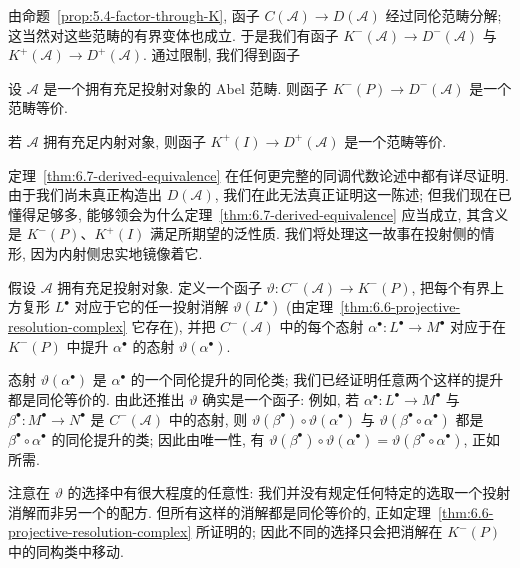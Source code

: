 由命题~\ref{prop:5.4-factor-through-K}, 函子 $C(\mathcal{A})\to D(\mathcal{A})$ 经过同伦范畴分解; 这当然对这些范畴的有界变体也成立. 于是我们有函子 $K^{-}(\mathcal{A})\to D^{-}(\mathcal{A})$ 与 $K^{+}(\mathcal{A})\to D^{+}(\mathcal{A})$. 通过限制, 我们得到函子

\begin{theorem}\label{thm:6.7-derived-equivalence}
设 $\mathcal{A}$ 是一个拥有充足投射对象的 Abel 范畴. 则函子 $K^{-}(P)\to D^{-}(\mathcal{A})$ 是一个范畴等价.

若 $\mathcal{A}$ 拥有充足内射对象, 则函子 $K^{+}(I)\to D^{+}(\mathcal{A})$ 是一个范畴等价.
\end{theorem}

\noindent 定理~\ref{thm:6.7-derived-equivalence} 在任何更完整的同调代数论述中都有详尽证明. 由于我们尚未真正构造出 $D(\mathcal{A})$, 我们在此无法真正证明这一陈述; 但我们现在已懂得足够多, 能够领会为什么定理~\ref{thm:6.7-derived-equivalence} 应当成立, 其含义是 $K^{-}(P)$、$K^{+}(I)$ 满足所期望的泛性质. 我们将处理这一故事在投射侧的情形, 因为内射侧忠实地镜像着它.

假设 $\mathcal{A}$ 拥有充足投射对象. 定义一个函子 $\vartheta:C^{-}(\mathcal{A})\to K^{-}(P)$, 把每个有界上方复形 $L^\bullet$ 对应于它的任一投射消解 $\vartheta(L^\bullet)$ (由定理~\ref{thm:6.6-projective-resolution-complex} 它存在), 并把 $C^{-}(\mathcal{A})$ 中的每个态射 $\alpha^\bullet:L^\bullet\to M^\bullet$ 对应于在 $K^{-}(P)$ 中提升 $\alpha^\bullet$ 的态射 $\vartheta(\alpha^\bullet)$.

态射 $\vartheta(\alpha^\bullet)$ 是 $\alpha^\bullet$ 的一个同伦提升的同伦类; 我们已经证明任意两个这样的提升都是同伦等价的. 由此还推出 $\vartheta$ 确实是一个函子: 例如, 若 $\alpha^\bullet:L^\bullet\to M^\bullet$ 与 $\beta^\bullet:M^\bullet\to N^\bullet$ 是 $C^{-}(\mathcal{A})$ 中的态射, 则 $\vartheta(\beta^\bullet)\circ\vartheta(\alpha^\bullet)$ 与 $\vartheta(\beta^\bullet\circ\alpha^\bullet)$ 都是 $\beta^\bullet\circ\alpha^\bullet$ 的同伦提升的类; 因此由唯一性, 有 $\vartheta(\beta^\bullet)\circ\vartheta(\alpha^\bullet)=\vartheta(\beta^\bullet\circ\alpha^\bullet)$, 正如所需.

注意在 $\vartheta$ 的选择中有很大程度的任意性: 我们并没有规定任何特定的选取一个投射消解而非另一个的配方. 但所有这样的消解都是同伦等价的, 正如定理~\ref{thm:6.6-projective-resolution-complex} 所证明的; 因此不同的选择只会把消解在 $K^{-}(P)$ 中的同构类中移动.

